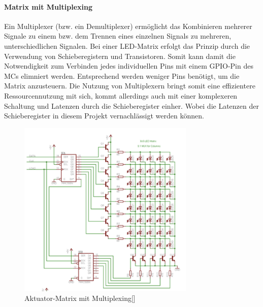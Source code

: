 \paragraph{Matrix mit Multiplexing}
Ein Multiplexer (bzw. ein Demultiplexer) ermöglicht das Kombinieren mehrerer Signale zu einem bzw. dem Trennen eines einzelnen Signals zu mehreren, unterschiedlichen Signalen.
Bei einer LED-Matrix erfolgt das Prinzip durch die Verwendung von Schieberegistern und Transistoren. %
Somit kann damit die Notwendigkeit zum Verbinden jedes individuellen Pins mit einem GPIO-Pin des \ac{MC}s elimniert werden.
Entsprechend werden weniger Pins benötigt, um die Matrix anzusteuern.
Die Nutzung von Multiplexern bringt somit eine effizientere Ressourcennutzung mit sich, kommt allerdings auch mit einer komplexeren Schaltung und Latenzen durch die Schieberegister einher. %
Wobei die Latenzen der Schieberegister in diesem Projekt vernachlässigt werden können.
\begin{figure}[htbp]
	\centering
	\includegraphics[width=0.75\textwidth]{img/matrixMuxSchaltung}
	\caption{Aktuator-Matrix mit Multiplexing[\cite*[][]{LEDMatrix}]}
	\label{fig:AktMatrixMux}
\end{figure}

